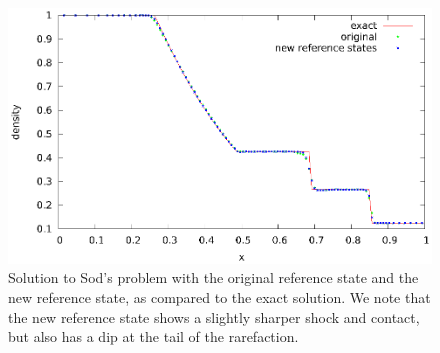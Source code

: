 \documentclass[12pt,preprint]{aastex}
\begin{document}
\begin{figure}
  \centering
  \includegraphics[scale=1.0]{reference}
  \caption{ \label{Fig:sod} Solution to Sod's problem with the original
    reference state and the new reference state, as compared to the
    exact solution.  We note that the new reference state shows a
    slightly sharper shock and contact, but also has a dip at the tail
    of the rarefaction.}
\end{figure}

\clearpage


\clearpage
\end{document}
